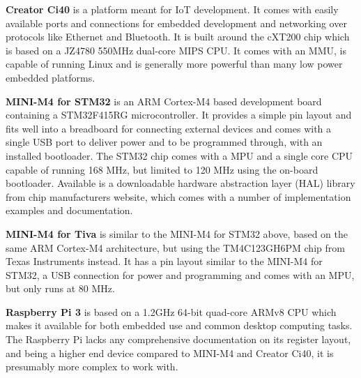 \textbf{Creator Ci40} is a platform meant for IoT development.
It comes with easily available ports and connections for embedded development
and networking over protocols like Ethernet and Bluetooth.
It is built around the cXT200 chip which is based on a JZ4780 550MHz dual-core MIPS CPU\cite{creator_ci40_specs}.
It comes with an MMU, is capable of running Linux
and is generally more powerful than many low power embedded platforms.

\textbf{MINI-M4 for STM32} is an ARM Cortex-M4 based development board containing a STM32F415RG microcontroller.
It provides a simple pin layout and fits well into a breadboard for connecting external devices
and comes with a single USB port to deliver power and to be programmed through, with an installed bootloader.
The STM32 chip comes with a MPU and a single core CPU capable of running 168 MHz,
but limited to 120 MHz using the on-board bootloader\cite{MINI-M4_stm32_specs}.
Available is a downloadable hardware abstraction layer (HAL) library from chip manufacturers website,
which comes with a number of implementation examples and documentation\cite{HAL_library}.

\textbf{MINI-M4 for Tiva} is similar to the MINI-M4 for STM32 above,
based on the same ARM Cortex-M4 architecture,
but using the TM4C123GH6PM chip from Texas Instruments instead.
It has a pin layout similar to the MINI-M4 for STM32,
a USB connection for power and programming and comes with an MPU,
but only runs at 80 MHz\cite{MINI-M4_tiva_specs}.

\textbf{Raspberry Pi 3} is
based on a 1.2GHz 64-bit quad-core ARMv8 CPU which
makes it available for both embedded use and common desktop computing tasks\cite{raspberry_specs}.
The Raspberry Pi lacks any comprehensive documentation on its register layout,
and being a higher end device compared to MINI-M4 and Creator Ci40,
it is presumably more complex to work with.


